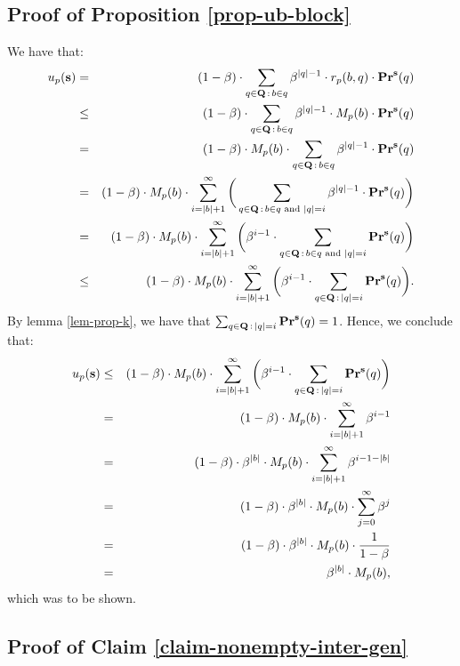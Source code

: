 \subsection{Proof of Proposition \ref{prop-ub-block}}
We have that:
\begin{eqnarray*}
u_p(\mathbf{s} ) & =  & (1 - \beta) \cdot  \sum_{q \in \mathbf{Q} \,:\, b \in q} \beta^{|q|-1} \cdot  r_p(b,q) \cdot \mathbf{Pr}^{\mathbf{s}}(q )\\
& \leq & (1 - \beta) \cdot  \sum_{q \in \mathbf{Q} \,:\, b \in q} \beta^{|q|-1} \cdot  M_p(b) \cdot \mathbf{Pr}^{\mathbf{s}}(q )\\
& = & (1 - \beta) \cdot  M_p(b) \cdot \sum_{q \in \mathbf{Q} \,:\, b \in q} \beta^{|q|-1} \cdot   \mathbf{Pr}^{\mathbf{s}}(q )\\
& = & (1 - \beta) \cdot  M_p(b) \cdot \sum_{i=|b|+1}^\infty \bigg(\sum_{q \in \mathbf{Q} \,:\, b \in q \text{ and } |q| = i} \beta^{|q|-1} \cdot   \mathbf{Pr}^{\mathbf{s}}(q )\bigg)\\
& = & (1 - \beta) \cdot  M_p(b) \cdot \sum_{i=|b|+1}^\infty \bigg(\beta^{i-1} \cdot \sum_{q \in \mathbf{Q} \,:\, b \in q \text{ and } |q| = i} \mathbf{Pr}^{\mathbf{s}}(q )\bigg)\\
& \leq & (1 - \beta) \cdot  M_p(b) \cdot \sum_{i=|b|+1}^\infty \bigg(\beta^{i-1} \cdot \sum_{q \in \mathbf{Q} \,:\, |q| = i} \mathbf{Pr}^{\mathbf{s}}(q )\bigg).
\end{eqnarray*}
By lemma \ref{lem-prop-k}, we have that $\sum_{q \in \mathbf{Q} \,:\, |q| = i} \mathbf{Pr}^{\mathbf{s}}(q ) = 1$. Hence, we conclude that:
\begin{eqnarray*}
u_p(\mathbf{s} ) & \leq & (1 - \beta) \cdot  M_p(b) \cdot \sum_{i=|b|+1}^\infty \bigg(\beta^{i-1} \cdot \sum_{q \in \mathbf{Q} \,:\, |q| = i} \mathbf{Pr}^{\mathbf{s}}(q )\bigg)\\
& = & (1 - \beta) \cdot  M_p(b) \cdot \sum_{i=|b|+1}^\infty \beta^{i-1}\\
& = & (1 - \beta) \cdot  \beta^{|b|} \cdot M_p(b) \cdot  \sum_{i=|b|+1}^\infty \beta^{i-1-|b|}\\
& = & (1 - \beta) \cdot  \beta^{|b|} \cdot M_p(b) \cdot \sum_{j=0}^\infty \beta^{j}\\
& = & (1 - \beta) \cdot  \beta^{|b|} \cdot M_p(b) \cdot \frac{1}{1-\beta}\\
& = & \beta^{|b|} \cdot M_p(b), 
\end{eqnarray*}
which was to be shown. 

\subsection*{Proof of Claim \ref{claim-nonempty-inter-gen}}

